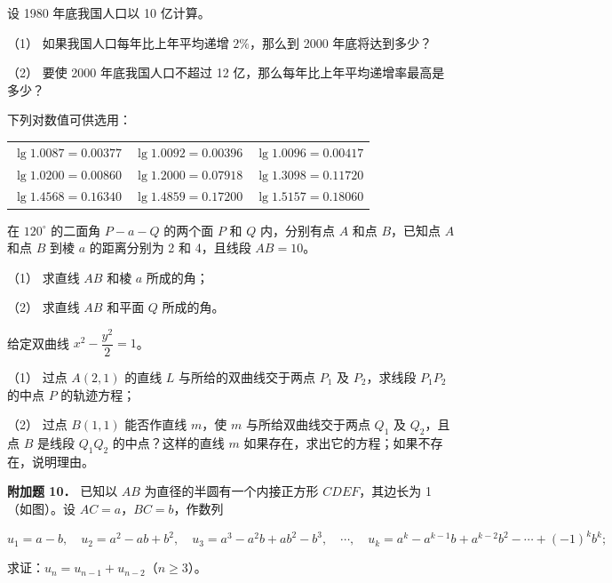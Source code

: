 \begin{question}
设 1980 年底我国人口以 10 亿计算。

（1） 如果我国人口每年比上年平均递增 $2\%$，那么到 2000 年底将达到多少？

（2） 要使 2000 年底我国人口不超过 12 亿，那么每年比上年平均递增率最高是多少？

下列对数值可供选用：

\begin{center}
\begin{tabular}{lll}
\toprule
 &  &  \\
\midrule
$\lg 1.0087=0.00377$ & $\lg 1.0092=0.00396$ & $\lg 1.0096=0.00417$ \\
$\lg 1.0200=0.00860$ & $\lg 1.2000=0.07918$ & $\lg 1.3098=0.11720$ \\
$\lg 1.4568=0.16340$ & $\lg 1.4859=0.17200$ & $\lg 1.5157=0.18060$ \\
\bottomrule
\end{tabular}
\end{center}

\end{question}
\begin{question}
在 $120^\circ$ 的二面角 $P-a-Q$ 的两个面 $P$ 和 $Q$ 内，分别有点 $A$ 和点 $B$，已知点 $A$ 和点 $B$ 到棱 $a$ 的距离分别为 2 和 4，且线段 $AB=10$。

（1） 求直线 $AB$ 和棱 $a$ 所成的角；

（2） 求直线 $AB$ 和平面 $Q$ 所成的角。

\Needspace{0.4\textheight}
\end{question}
\begin{question}
给定双曲线 $x^2-\dfrac{y^2}{2}=1$。

（1） 过点 $A(2,1)$ 的直线 $L$ 与所给的双曲线交于两点 $P_1$ 及 $P_2$，求线段 $P_1P_2$ 的中点 $P$ 的轨迹方程；

（2） 过点 $B(1,1)$ 能否作直线 $m$，使 $m$ 与所给双曲线交于两点 $Q_1$ 及 $Q_2$，且点 $B$ 是线段 $Q_1Q_2$ 的中点？这样的直线 $m$ 如果存在，求出它的方程；如果不存在，说明理由。

\textbf{附加题 10．} 已知以 $AB$ 为直径的半圆有一个内接正方形 $CDEF$，其边长为 1（如图）。设 $AC=a$，$BC=b$，作数列

\nopagebreak[4]
\[
u_1=a-b,\quad u_2=a^2-ab+b^2,\quad u_3=a^3-a^2b+ab^2-b^3,\quad\cdots,\quad
u_k=a^k-a^{k-1}b+a^{k-2}b^2-\cdots+(-1)^k b^k;
\]

求证：$u_n=u_{n-1}+u_{n-2}$（$n\geqslant 3$）。
\nopagebreak[4]
\begin{center}\end{center}
\nopagebreak[4]

\end{question}